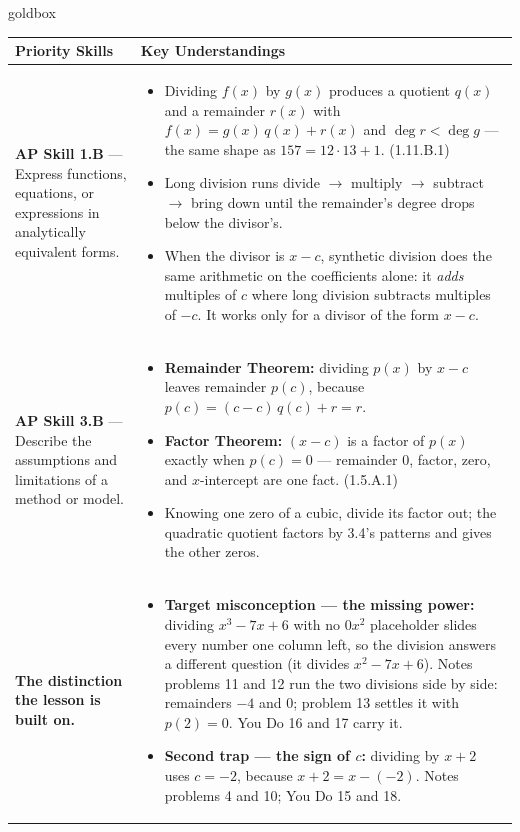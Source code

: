 \documentclass[10pt]{article}
\begin{document}
\renewcommand{\arraystretch}{1.6}
\begin{skillbox}{goldbox}
\begin{tabularx}{\linewidth}{@{}X X@{}}
\textbf{Priority Skills} &
\textbf{Key Understandings} \\
\midrule
\textbf{AP Skill 1.B} --- Express functions, equations, or expressions in analytically
equivalent forms. &
\begin{itemize}[leftmargin=1.2em,itemsep=2pt,topsep=0pt]
  \item Dividing $f(x)$ by $g(x)$ produces a quotient $q(x)$ and a remainder $r(x)$ with
        $f(x) = g(x)\,q(x) + r(x)$ and $\deg r < \deg g$ --- the same shape as
        $157 = 12 \cdot 13 + 1$. (1.11.B.1)
  \item Long division runs divide $\to$ multiply $\to$ subtract $\to$ bring down until the
        remainder's degree drops below the divisor's.
  \item When the divisor is $x - c$, synthetic division does the same arithmetic on the
        coefficients alone: it \emph{adds} multiples of $c$ where long division subtracts
        multiples of $-c$. It works only for a divisor of the form $x - c$.
\end{itemize} \\
\textbf{AP Skill 3.B} --- Describe the assumptions and limitations of a method or model. &
\begin{itemize}[leftmargin=1.2em,itemsep=2pt,topsep=0pt]
  \item \textbf{Remainder Theorem:} dividing $p(x)$ by $x - c$ leaves remainder $p(c)$,
        because $p(c) = (c - c)\,q(c) + r = r$.
  \item \textbf{Factor Theorem:} $(x - c)$ is a factor of $p(x)$ exactly when $p(c) = 0$ ---
        remainder $0$, factor, zero, and $x$-intercept are one fact. (1.5.A.1)
  \item Knowing one zero of a cubic, divide its factor out; the quadratic quotient factors by
        3.4's patterns and gives the other zeros.
\end{itemize} \\
\textbf{The distinction the lesson is built on.} &
\begin{itemize}[leftmargin=1.2em,itemsep=2pt,topsep=0pt]
  \item \textbf{Target misconception --- the missing power:} dividing $x^3 - 7x + 6$ with no
        $0x^2$ placeholder slides every number one column left, so the division answers a
        different question (it divides $x^2 - 7x + 6$). Notes problems 11 and 12 run the two
        divisions side by side: remainders $-4$ and $0$; problem 13 settles it with
        $p(2) = 0$. You Do 16 and 17 carry it.
  \item \textbf{Second trap --- the sign of $c$:} dividing by $x + 2$ uses $c = -2$, because
        $x + 2 = x - (-2)$. Notes problems 4 and 10; You Do 15 and 18.
\end{itemize} \\
\end{tabularx}
\end{skillbox}
\end{document}
